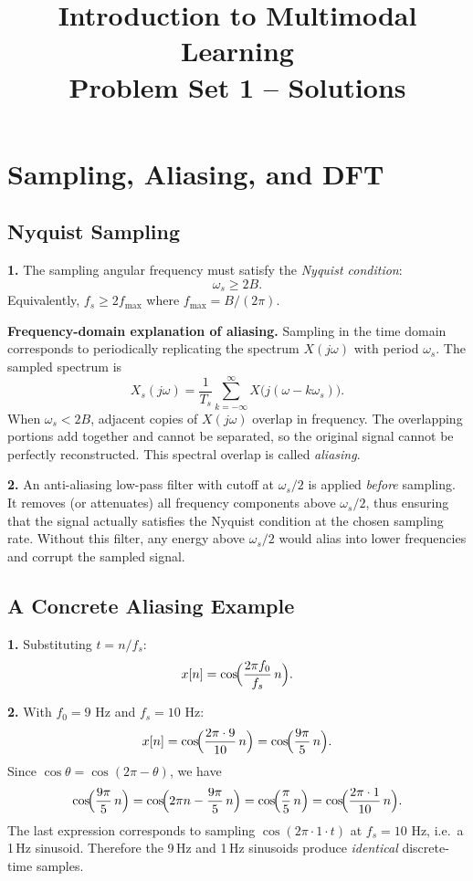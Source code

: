 \documentclass[11pt,a4paper]{article}
\title{Introduction to Multimodal Learning\\Problem Set 1 -- Solutions}
\author{}
\date{}
\begin{document}
\maketitle

\section{Sampling, Aliasing, and DFT}

\subsection{Nyquist Sampling}

\textbf{1.} The sampling angular frequency must satisfy the \emph{Nyquist condition}:
\[
  \omega_s \geq 2B.
\]
Equivalently, $f_s \geq 2f_{\max}$ where $f_{\max} = B/(2\pi)$.

\textbf{Frequency-domain explanation of aliasing.}
Sampling in the time domain corresponds to periodically replicating the spectrum $X(j\omega)$ with period $\omega_s$.  The sampled spectrum is
\[
  X_s(j\omega) = \frac{1}{T_s}\sum_{k=-\infty}^{\infty} X\bigl(j(\omega - k\omega_s)\bigr).
\]
When $\omega_s < 2B$, adjacent copies of $X(j\omega)$ overlap in frequency.  The overlapping portions add together and cannot be separated, so the original signal cannot be perfectly reconstructed.  This spectral overlap is called \emph{aliasing}.

\medskip
\textbf{2.} An anti-aliasing low-pass filter with cutoff at $\omega_s/2$ is applied \emph{before} sampling.  It removes (or attenuates) all frequency components above $\omega_s/2$, thus ensuring that the signal actually satisfies the Nyquist condition at the chosen sampling rate.  Without this filter, any energy above $\omega_s/2$ would alias into lower frequencies and corrupt the sampled signal.

\subsection{A Concrete Aliasing Example}

\textbf{1.} Substituting $t = n/f_s$:
\[
  x[n] = \cos\!\Bigl(\frac{2\pi f_0}{f_s}\,n\Bigr).
\]

\textbf{2.} With $f_0 = 9$ Hz and $f_s = 10$ Hz:
\[
  x[n] = \cos\!\Bigl(\frac{2\pi \cdot 9}{10}\,n\Bigr)
       = \cos\!\Bigl(\frac{9\pi}{5}\,n\Bigr).
\]
Since $\cos\theta = \cos(2\pi - \theta)$, we have
\[
  \cos\!\Bigl(\frac{9\pi}{5}\,n\Bigr)
  = \cos\!\Bigl(2\pi n - \frac{9\pi}{5}\,n\Bigr)
  = \cos\!\Bigl(\frac{\pi}{5}\,n\Bigr)
  = \cos\!\Bigl(\frac{2\pi \cdot 1}{10}\,n\Bigr).
\]
The last expression corresponds to sampling $\cos(2\pi \cdot 1 \cdot t)$ at $f_s = 10$ Hz, i.e.\ a 1\,Hz sinusoid.  Therefore the 9\,Hz and 1\,Hz sinusoids produce \emph{identical} discrete-time samples.
\end{document}
